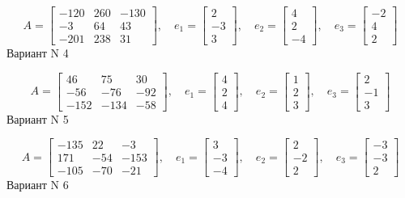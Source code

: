 \documentclass[11pt]{report}
\begin{document}
$$A = \left[\begin{matrix}-120 & 260 & -130\\-3 & 64 & 43\\-201 & 238 & 31\end{matrix}\right],\quad e_1 = \left[\begin{matrix}2\\-3\\3\end{matrix}\right],\quad e_2 = \left[\begin{matrix}4\\2\\-4\end{matrix}\right],\quad e_3 = \left[\begin{matrix}-2\\4\\2\end{matrix}\right]$$Вариант N 4

$$A = \left[\begin{matrix}46 & 75 & 30\\-56 & -76 & -92\\-152 & -134 & -58\end{matrix}\right],\quad e_1 = \left[\begin{matrix}4\\2\\4\end{matrix}\right],\quad e_2 = \left[\begin{matrix}1\\2\\3\end{matrix}\right],\quad e_3 = \left[\begin{matrix}2\\-1\\3\end{matrix}\right]$$Вариант N 5

$$A = \left[\begin{matrix}-135 & 22 & -3\\171 & -54 & -153\\-105 & -70 & -21\end{matrix}\right],\quad e_1 = \left[\begin{matrix}3\\-3\\-4\end{matrix}\right],\quad e_2 = \left[\begin{matrix}2\\-2\\2\end{matrix}\right],\quad e_3 = \left[\begin{matrix}-3\\-3\\2\end{matrix}\right]$$Вариант N 6
\end{document}
